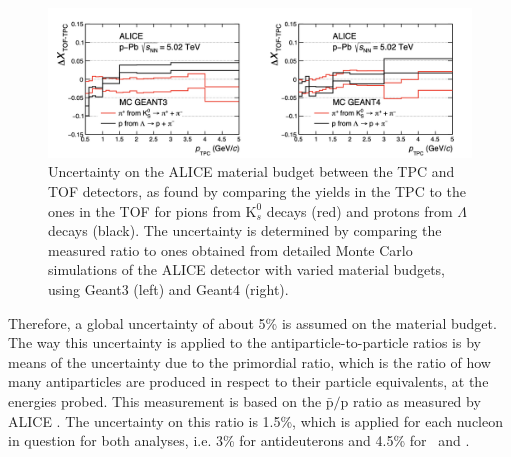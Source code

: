 \begin{figure}
    \centering
    \includegraphics[width=\textwidth]{figures/ALICE_material_budget_tests.png}
    \caption{Uncertainty on the ALICE material budget between the TPC and TOF detectors, as found by comparing the yields in the TPC to the ones in the TOF for pions from $\mathrm{K}_s^0$ decays (red) and protons from $\Lambda$ decays (black). The uncertainty is determined by comparing the measured ratio to ones obtained from detailed Monte Carlo simulations of the ALICE detector with varied material budgets, using Geant3 (left) and Geant4 (right).}
    \label{fig:ALICE_mat_budget}
\end{figure}

Therefore, a global uncertainty of about 5\% is assumed on the material budget. The way this uncertainty is applied to the antiparticle-to-particle ratios is by means of the uncertainty due to the primordial ratio, which is the ratio of how many antiparticles are produced in respect to their particle equivalents, at the energies probed. This measurement is based on the $\bar{\mathrm{p}}/\mathrm{p}$ ratio as measured by ALICE \cite{}. The uncertainty on this ratio is 1.5\%, which is applied for each nucleon in question for both analyses, i.e. 3\% for antideuterons and 4.5\% for \ahe\ and \atrit .

